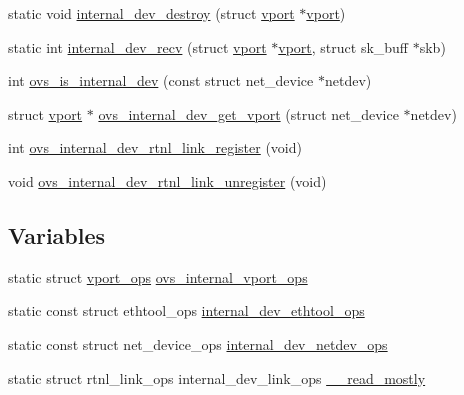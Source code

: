 \begin{DoxyCompactItemize}
static void \hyperlink{linux_2vport-internal__dev_8c_ab75c92e096800c974c1d1590e797cd2d}{internal\+\_\+dev\+\_\+destroy} (struct \hyperlink{structvport}{vport} $\ast$\hyperlink{structvport}{vport})
\item 
static int \hyperlink{linux_2vport-internal__dev_8c_a259b00fb99d12379c06cf2b9d2de6050}{internal\+\_\+dev\+\_\+recv} (struct \hyperlink{structvport}{vport} $\ast$\hyperlink{structvport}{vport}, struct sk\+\_\+buff $\ast$skb)
\item 
int \hyperlink{linux_2vport-internal__dev_8c_a2056d15823f88a4caeb90001bce724bb}{ovs\+\_\+is\+\_\+internal\+\_\+dev} (const struct net\+\_\+device $\ast$netdev)
\item 
struct \hyperlink{structvport}{vport} $\ast$ \hyperlink{linux_2vport-internal__dev_8c_abdb7a75d6c79176507a41a200c69e77b}{ovs\+\_\+internal\+\_\+dev\+\_\+get\+\_\+vport} (struct net\+\_\+device $\ast$netdev)
\item 
int \hyperlink{linux_2vport-internal__dev_8c_ac6d8a2dd3cdef9e9ba9efdd4e0656f7c}{ovs\+\_\+internal\+\_\+dev\+\_\+rtnl\+\_\+link\+\_\+register} (void)
\item 
void \hyperlink{linux_2vport-internal__dev_8c_a4e61a8459847af3c4f5773e09552cf98}{ovs\+\_\+internal\+\_\+dev\+\_\+rtnl\+\_\+link\+\_\+unregister} (void)
\end{DoxyCompactItemize}
\subsection*{Variables}
\begin{DoxyCompactItemize}
\item 
static struct \hyperlink{structvport__ops}{vport\+\_\+ops} \hyperlink{linux_2vport-internal__dev_8c_a20321257f6991e7ffb535947c382401e}{ovs\+\_\+internal\+\_\+vport\+\_\+ops}
\item 
static const struct ethtool\+\_\+ops \hyperlink{linux_2vport-internal__dev_8c_aa2c816d0e5a964778079cefc6d9f2c13}{internal\+\_\+dev\+\_\+ethtool\+\_\+ops}
\item 
static const struct net\+\_\+device\+\_\+ops \hyperlink{linux_2vport-internal__dev_8c_af6e4b8260f029c8e987281b6e9890b8e}{internal\+\_\+dev\+\_\+netdev\+\_\+ops}
\item 
static struct rtnl\+\_\+link\+\_\+ops internal\+\_\+dev\+\_\+link\+\_\+ops \hyperlink{linux_2vport-internal__dev_8c_a8e42f895d19142ac43bdcfedf9271120}{\+\_\+\+\_\+read\+\_\+mostly}
\end{DoxyCompactItemize}


